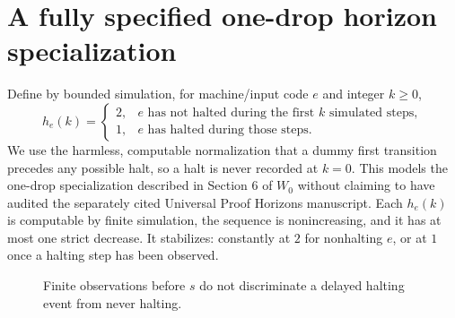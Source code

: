 \documentclass[11pt,letterpaper]{article}
\begin{document}
\section{A fully specified one-drop horizon specialization}
Define by bounded simulation, for machine/input code $e$ and integer $k\ge0$,
\[
h_e(k)=\begin{cases}2,&\text{$e$ has not halted during the first $k$ simulated steps},\\1,&\text{$e$ has halted during those steps}.
\end{cases}
\]
We use the harmless, computable normalization that a dummy first transition precedes any possible halt, so a halt is never recorded at $k=0$. This models the one-drop specialization described in Section 6 of $W_0$ without claiming to have audited the separately cited Universal Proof Horizons manuscript. Each $h_e(k)$ is computable by finite simulation, the sequence is nonincreasing, and it has at most one strict decrease. It stabilizes: constantly at $2$ for nonhalting $e$, or at $1$ once a halting step has been observed.

\begin{figure}[htbp]\centering
{}
\caption{Finite observations before $s$ do not discriminate a delayed halting event from never halting.}
\end{figure}
\end{document}
